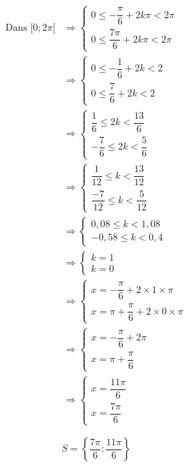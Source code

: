 \documentclass[a4paper,12pt]{article}
\begin{document}
\[
\begin{aligned}
\text{Dans } [0 ; 2\pi[ &\Rightarrow
\begin{cases}
0 \leq -\dfrac{\pi}{6} + 2k\pi < 2\pi \\
0 \leq \dfrac{7\pi}{6} + 2k\pi < 2\pi
\end{cases}\\[1em]
&\Rightarrow
\begin{cases}
0 \leq -\dfrac{1}{6} + 2k < 2 \\
0 \leq \dfrac{7}{6} + 2k < 2
\end{cases}\\[1em]
&\Rightarrow
\begin{cases}
\dfrac{1}{6} \leq 2k < \dfrac{13}{6} \\
-\dfrac{7}{6} \leq 2k < \dfrac{5}{6}
\end{cases}\\[1em]
&\Rightarrow
\begin{cases}
\dfrac{1}{12} \leq k < \dfrac{13}{12} \\[1em]
\dfrac{-7}{12} \leq k < \dfrac{5}{12}
\end{cases}\\[1em]
&\Rightarrow
\begin{cases}
0,08 \leq k < 1,08 \\[1em]
-0,58 \leq k < 0,4
\end{cases}\\[1em]
&\Rightarrow
\begin{cases}
k=1 \\[1em]
k=0
\end{cases}\\[1em]
&\Rightarrow
\begin{cases}
x = -\dfrac{\pi}{6} + 2\times 1 \times\pi \\
x = \pi + \dfrac{\pi}{6} + 2\times 0 \times\pi
\end{cases}\\[1em]
&\Rightarrow
\begin{cases}
x = -\dfrac{\pi}{6} + 2\pi \\
x = \pi + \dfrac{\pi}{6}
\end{cases}\\[1em]
&\Rightarrow
\begin{cases}
x = \dfrac{11\pi}{6}\\[1em]
x = \dfrac{7\pi}{6}
\end{cases}
\end{aligned}
\]

\[
\boxed{S = \left\{\dfrac{7\pi}{6}; \dfrac{11\pi}{6} \right\}}
\]
\end{document}
